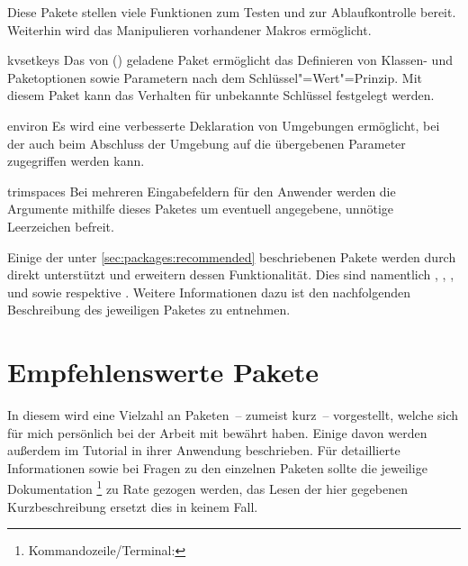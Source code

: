 \begin{packages}
  Diese Pakete stellen viele Funktionen zum Testen und zur Ablaufkontrolle 
  bereit. Weiterhin wird das Manipulieren vorhandener Makros ermöglicht.
\item[kvsetkeys]
  Das von () geladene Paket 
   ermöglicht das Definieren von Klassen- und Paketoptionen 
  sowie Parametern nach dem Schlüssel"=Wert"=Prinzip. Mit diesem Paket kann das 
  Verhalten für unbekannte Schlüssel festgelegt werden.
\item[environ]
  Es wird eine verbesserte Deklaration von Umgebungen ermöglicht, bei der auch 
  beim Abschluss der Umgebung auf die übergebenen Parameter zugegriffen werden 
  kann. 
\item[trimspaces]
  Bei mehreren Eingabefeldern für den Anwender werden die Argumente mithilfe 
  dieses Paketes um eventuell angegebene, unnötige Leerzeichen befreit.
\end{packages}



%
Einige der unter \autoref{sec:packages:recommended} beschriebenen Pakete werden 
durch \TUDScript direkt unterstützt und erweitern dessen Funktionalität. Dies
sind namentlich , , , 
 und  sowie  respektive 
. Weitere Informationen dazu ist den nachfolgenden 
Beschreibung des jeweiligen Paketes zu entnehmen.



\section{%
  Empfehlenswerte Pakete%
  \label{sec:packages:recommended}%
}
In diesem \autorefname wird eine Vielzahl an Paketen~-- zumeist kurz~-- 
vorgestellt, welche sich für mich persönlich bei der Arbeit mit  
bewährt haben. Einige davon werden außerdem im Tutorial  in 
ihrer Anwendung beschrieben. Für detaillierte Informationen sowie bei Fragen zu 
den einzelnen Paketen sollte die jeweilige Dokumentation%
\footnote{Kommandozeile/Terminal: }
zu Rate gezogen werden, das Lesen der hier gegebenen Kurzbeschreibung ersetzt 
dies in keinem Fall. 
\NewExpandableDocumentCommand{}


